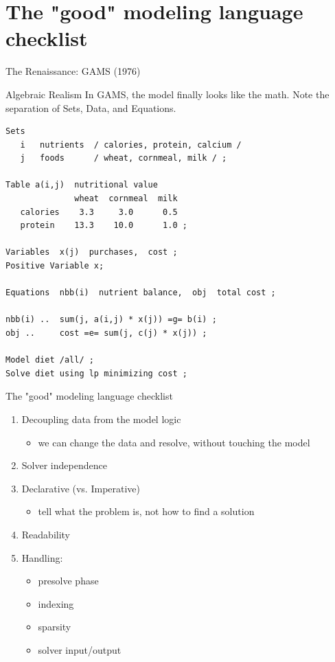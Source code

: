\documentclass[presentation, aspectratio=169]{beamer}
\begin{document}
\section{The "good" modeling language checklist}
\label{sec:orgc8a06dd}
\begin{frame}[label={sec:org1e4c20c},fragile]{The Renaissance: GAMS (1976)}
 \begin{block}{Algebraic Realism}
In GAMS, the model finally looks like the math. Note the separation of \alert{\alert{Sets}}, \alert{\alert{Data}}, and \alert{\alert{Equations}}.

{\scriptsize
\begin{verbatim}
Sets
   i   nutrients  / calories, protein, calcium /
   j   foods      / wheat, cornmeal, milk / ;

Table a(i,j)  nutritional value
              wheat  cornmeal  milk
   calories    3.3     3.0      0.5
   protein    13.3    10.0      1.0 ;

Variables  x(j)  purchases,  cost ;
Positive Variable x;

Equations  nbb(i)  nutrient balance,  obj  total cost ;

nbb(i) ..  sum(j, a(i,j) * x(j)) =g= b(i) ;
obj ..     cost =e= sum(j, c(j) * x(j)) ;

Model diet /all/ ;
Solve diet using lp minimizing cost ;
\end{verbatim}
}
\end{block}
\end{frame}


\begin{frame}[label={sec:org5eac1e6}]{The "good" modeling language checklist}
\begin{enumerate}
\item Decoupling data from the model logic
\begin{itemize}
\item we can change the data and resolve, without touching the model
\end{itemize}
\item Solver independence
\item Declarative (vs. Imperative)
\begin{itemize}
\item tell what the problem is, not how to find a solution
\end{itemize}
\item Readability
\item Handling:
\begin{itemize}
\item presolve phase
\item indexing
\item sparsity
\item solver input/output
\end{itemize}
\end{enumerate}
\end{frame}
\end{document}
